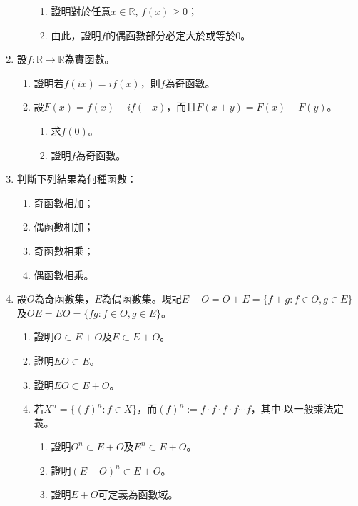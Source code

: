 \documentclass[12pt]{article}
\begin{document}
\begin{enumerate}
\begin{enumerate}
\begin{enumerate}
                \item 證明對於任意$x\in\mathbb{R}$, $f(x)\geq 0$；
                \item 由此，證明$f$的偶函數部分必定大於或等於$0$。
            \end{enumerate}
        \end{enumerate}
        \item 設$f:\mathbb{R}\to\mathbb{R}$為實函數。\begin{enumerate}
            \item 證明若$f(ix)=if(x)$，則$f$為奇函數。
            \item 設$F(x)=f(x)+if(-x)$，而且$F(x+y)=F(x)+F(y)$。\begin{enumerate}
                \item 求$f(0)$。
                \item 證明$f$為奇函數。
            \end{enumerate}
        \end{enumerate}
        \item 判斷下列結果為何種函數：\begin{enumerate}
            \item 奇函數相加；
            \item 偶函數相加；
            \item 奇函數相乘；
            \item 偶函數相乘。
        \end{enumerate}
        \item 設$O$為奇函數集，$E$為偶函數集。現記$E+O=O+E=\{f+g:f\in O, g\in E\}$及$OE=EO=\{fg:f\in O,g\in E\}$。\begin{enumerate}
            \item 證明$O\subset E+O$及$E\subset E+O$。
            \item 證明$EO\subset E$。
            \item 證明$EO\subset E+O$。
            \item 若$X^n=\{(f)^n:f\in X\}$，而$(f)^n:=f\cdot f\cdot f\cdot f\cdots f$，其中$\cdot$以一般乘法定義。\begin{enumerate}
                \item 證明$O^n\subset E+O$及$E^n\subset E+O$。
                \item 證明$(E+O)^n\subset E+O$。
                \item 證明$E+O$可定義為函數域。
            \end{enumerate}
        \end{enumerate}
    \end{enumerate}
\end{document}
